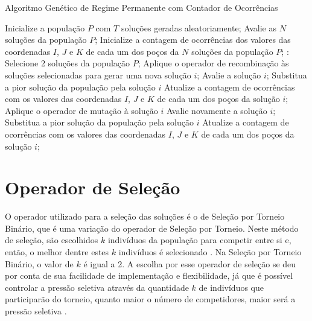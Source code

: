 \begin{algorithm}[!htbp]
  \caption{Algoritmo Genético de Regime Permanente com Contador de Ocorrências}
  \label{alg:agrpm2}
  \begin{algorithmic}
    \State Inicialize a população $P$ com $T$ soluções geradas aleatoriamente;
    \State Avalie as $N$ soluções da população $P$;
    \State Inicialize a contagem de ocorrências dos valores das coordenadas $I$, $J$ e $K$ de cada um dos poços da $N$ soluções da população $P$;
       \State:
        \State Selecione 2 soluções da população $P$;
        \State Aplique o operador de recombinação às soluções selecionadas para gerar uma nova solução $i$;
        \State Avalie a solução $i$;
          \State Substitua a pior solução da população pela solução $i$	
          \State Atualize a contagem de ocorrências com os valores das coordenadas $I$, $J$ e $K$ de cada um dos poços da solução $i$;
        \Else
          \State Aplique o operador de mutação à solução $i$	
          \State Avalie novamente a solução $i$;
            \State Substitua a pior solução da população pela solução $i$
            \State Atualize a contagem de ocorrências com os valores das coordenadas $I$, $J$ e $K$ de cada um dos poços da solução $i$;
          \EndIf
        \EndIf
      \EndFor
    \EndWhile
  \end{algorithmic}
\end{algorithm}

\section{Operador de Seleção}
\label{sec:3_OperadorSelecao}
O operador utilizado para a seleção das soluções é o de Seleção por Torneio Binário, que é uma variação do operador de Seleção por Torneio. Neste método de seleção, são escolhidos $k$ indivíduos da população para competir entre si e, então, o melhor dentre estes $k$ indivíduos é selecionado \cite{Kacprzyk2015}. Na Seleção por Torneio Binário, o valor de $k$ é igual a 2. A escolha por esse operador de seleção se deu por conta de sua facilidade de implementação e flexibilidade, já que é possível controlar a pressão seletiva através da quantidade $k$ de indivíduos que participarão do torneio, quanto maior o número de competidores, maior será a pressão seletiva \cite{Miller1995}.

